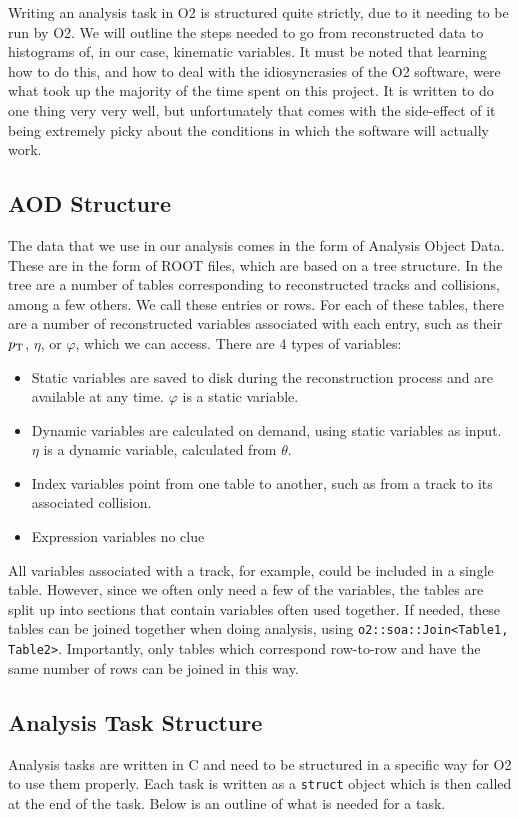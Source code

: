 Writing an analysis task in O2 is structured quite strictly, due to it needing to be run by O2. We will outline the steps needed to go from reconstructed data to histograms of, in our case, kinematic variables. It must be noted that learning how to do this, and how to deal with the idiosyncrasies of the O2 software, were what took up the majority of the time spent on this project. It is written to do one thing very very well, but unfortunately that comes with the side-effect of it being extremely picky about the conditions in which the software will actually work. 

\subsection{AOD Structure}\label{sec:AODStructure}
The data that we use in our analysis comes in the form of Analysis Object Data. These are in the form of ROOT files, which are based on a tree structure. In the tree are a number of tables corresponding to reconstructed tracks and collisions, among a few others. We call these entries or rows. For each of these tables, there are a number of reconstructed variables associated with each entry, such as their $p_\mathrm{T}$, $\eta$, or $\varphi$, which we can access. There are 4 types of variables:
\begin{itemize}
    \item Static variables are saved to disk during the reconstruction process and are available at any time. $\varphi$ is a static variable.
    \item Dynamic variables are calculated on demand, using static variables as input. $\eta$ is a dynamic variable, calculated from $\theta$. 
    \item Index variables point from one table to another, such as from a track to its associated collision.
    \item Expression variables no clue
\end{itemize}

All variables associated with a track, for example, could be included in a single table. However, since we often only need a few of the variables, the tables are split up into sections that contain variables often used together. If needed, these tables can be joined together when doing analysis, using \texttt{o2::soa::Join<Table1, Table2>}. Importantly, only tables which correspond row-to-row and have the same number of rows can be joined in this way.

\subsection{Analysis Task Structure}\label{sec:TaskStructure}
Analysis tasks are written in C\OldTexttt{++} and need to be structured in a specific way for O2 to use them properly. Each task is written as a \texttt{struct} object which is then called at the end of the task. Below is an outline of what is needed for a task.

